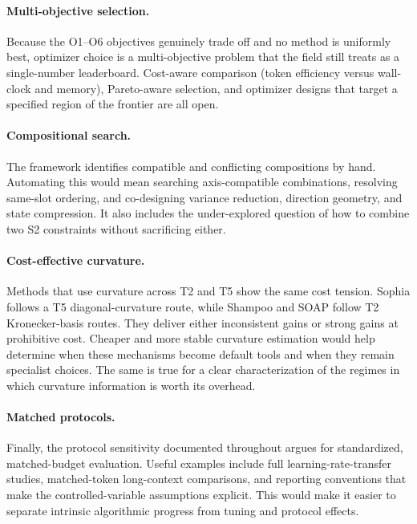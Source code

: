 \paragraph{Multi-objective selection.}
Because the O1--O6 objectives genuinely trade off and no method is uniformly
best, optimizer choice is a multi-objective problem that the field still treats
as a single-number leaderboard. Cost-aware comparison (token efficiency versus
wall-clock and memory), Pareto-aware selection, and optimizer designs that target
a specified region of the frontier are all open.

\paragraph{Compositional search.}
The framework identifies compatible and conflicting compositions by hand.
Automating this would mean searching axis-compatible combinations, resolving
same-slot ordering, and co-designing variance reduction, direction geometry, and
state compression. It also includes the under-explored question of how to combine
two S2 constraints without sacrificing either.

\paragraph{Cost-effective curvature.}
Methods that use curvature across T2 and T5 show the same cost tension.
Sophia follows a T5 diagonal-curvature route, while Shampoo and SOAP follow T2
Kronecker-basis routes. They deliver either inconsistent gains or strong gains
at prohibitive cost. Cheaper and more stable curvature estimation would help
determine when these mechanisms become default tools and when they remain
specialist choices. The same is true for a clear characterization of the regimes
in which curvature information is worth its overhead.

\paragraph{Matched protocols.}
Finally, the protocol sensitivity documented throughout argues for standardized,
matched-budget evaluation. Useful examples include full learning-rate-transfer
studies, matched-token long-context
comparisons, and reporting conventions that make the controlled-variable
assumptions explicit. This would make it easier to separate intrinsic
algorithmic progress from tuning and protocol effects.
